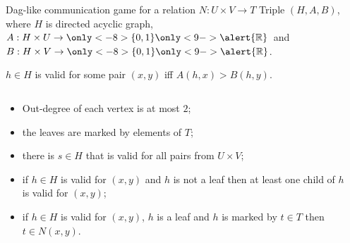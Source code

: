 \begin{frame}{Dag-like  communication game for a relation $N: U \times V \to T$}
    Triple $(H, A, B)$, where $H$ is directed acyclic graph, $A: H \times U \to \only<-8>{\{0, 1\}}
    \only<9->{\alert{\mathbb{R}}}$~and $B: H \times V \to \only<-8>{\{0, 1\}}
    \only<9->{\alert{\mathbb{R}}}$.

    \pause
    $h \in H$ is valid for some pair $(x, y)$ iff $A(h, x) > B(h, y)$.

    \pause

    \begin{columns}[t]
		\begin{column}{0.7\textwidth}
            \begin{itemize}
                \item<4-> Out-degree of each vertex is at most $2$;
	            \item<5-> the leaves are marked by elements of $T$;
    		    \item<6-> there is $s \in H$ that is valid for all pairs from $U \times V$;
		        \item<7-> if $h \in H$ is valid for $(x, y)$ and $h$ is not a leaf then at least one
                    child of $h$ is valid for $(x, y)$;
	    	    \item<8-> if $h \in H$ is valid for $(x, y)$, $h$ is a leaf and $h$ is marked by $t \in
                    T$ then $t \in N(x, y)$.
	        \end{itemize}

        \end{column}
        
		\begin{column}{0.25\textwidth}
            
		\end{column}
	\end{columns}

\end{frame}


